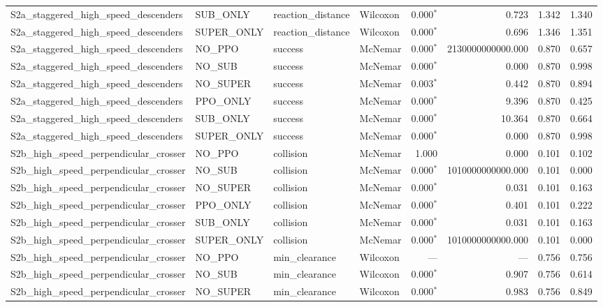 \begin{tabular}{llllrrrl}
  S2a_staggered_high_speed_descenders & SUB_ONLY & reaction_distance & Wilcoxon & 0.000$^{*}$ & 0.723 & 1.342 & 1.340 \\
  S2a_staggered_high_speed_descenders & SUPER_ONLY & reaction_distance & Wilcoxon & 0.000$^{*}$ & 0.696 & 1.346 & 1.351 \\
  S2a_staggered_high_speed_descenders & NO_PPO & success & McNemar & 0.000$^{*}$ & 2130000000000.000 & 0.870 & 0.657 \\
  S2a_staggered_high_speed_descenders & NO_SUB & success & McNemar & 0.000$^{*}$ & 0.000 & 0.870 & 0.998 \\
  S2a_staggered_high_speed_descenders & NO_SUPER & success & McNemar & 0.003$^{*}$ & 0.442 & 0.870 & 0.894 \\
  S2a_staggered_high_speed_descenders & PPO_ONLY & success & McNemar & 0.000$^{*}$ & 9.396 & 0.870 & 0.425 \\
  S2a_staggered_high_speed_descenders & SUB_ONLY & success & McNemar & 0.000$^{*}$ & 10.364 & 0.870 & 0.664 \\
  S2a_staggered_high_speed_descenders & SUPER_ONLY & success & McNemar & 0.000$^{*}$ & 0.000 & 0.870 & 0.998 \\
  S2b_high_speed_perpendicular_crosser & NO_PPO & collision & McNemar & 1.000 & 0.000 & 0.101 & 0.102 \\
  S2b_high_speed_perpendicular_crosser & NO_SUB & collision & McNemar & 0.000$^{*}$ & 1010000000000.000 & 0.101 & 0.000 \\
  S2b_high_speed_perpendicular_crosser & NO_SUPER & collision & McNemar & 0.000$^{*}$ & 0.031 & 0.101 & 0.163 \\
  S2b_high_speed_perpendicular_crosser & PPO_ONLY & collision & McNemar & 0.000$^{*}$ & 0.401 & 0.101 & 0.222 \\
  S2b_high_speed_perpendicular_crosser & SUB_ONLY & collision & McNemar & 0.000$^{*}$ & 0.031 & 0.101 & 0.163 \\
  S2b_high_speed_perpendicular_crosser & SUPER_ONLY & collision & McNemar & 0.000$^{*}$ & 1010000000000.000 & 0.101 & 0.000 \\
  S2b_high_speed_perpendicular_crosser & NO_PPO & min_clearance & Wilcoxon & --- & --- & 0.756 & 0.756 \\
  S2b_high_speed_perpendicular_crosser & NO_SUB & min_clearance & Wilcoxon & 0.000$^{*}$ & 0.907 & 0.756 & 0.614 \\
  S2b_high_speed_perpendicular_crosser & NO_SUPER & min_clearance & Wilcoxon & 0.000$^{*}$ & 0.983 & 0.756 & 0.849 \\

\end{tabular}
